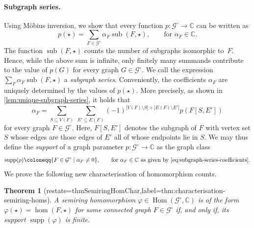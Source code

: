 \documentclass[11pt]{scrartcl}
\theoremstyle{definition}
\theoremstyle{plain}
\newtheorem{theorem}[definition]{Theorem}
\theoremstyle{remark}
\renewcommand\phi\varphi
\DeclareMathOperator\Hom{Hom}
\DeclareMathOperator{\supp}{supp}
\DeclareMathOperator{\sub}{sub}
\newcommand{\lG}{\mathcal{G}^\circ}
\newcommand{\C}{\mathbb{C}}
\begin{document}
	\paragraph{Subgraph series.}
	Using M\"obius inversion, we show that every function $p \colon \lG \to \mathbb{C}$ can be written as
	\[
		p(\star) = \sum_{F \in \lG} \alpha_F \sub(F, \star),
        \qquad 
        \text{for } \alpha_F \in \mathbb{C}.
	\]
	The function $\sub(F, \star)$ counts the number of subgraphs isomorphic to~$F$.
	Hence, while the above sum is infinite, only finitely many summands contribute to the value of $p(G)$ for every graph $G \in \lG$.
	We call the expression $\sum_{F} \alpha_F \sub(F, \star)$ a \emph{subgraph series}.
	Conveniently, the coefficients $\alpha_F$ are uniquely determined by the values of $p(\star)$.
	More precisely, as shown in \cref{lem:unique-subgraph-series}, it holds that
	\begin{equation}\label{eq:subgraph-series-coefficients}
		\alpha_F = \sum_{S \subseteq V(F)} \ \sum_{E' \subseteq E(F)} (-1)^{|V(F) \setminus S| + |E(F) \setminus E'|} p(F[S, E'])
	\end{equation}
	for every graph $F\in \lG$.
	Here, $F[S, E']$ denotes the subgraph of $F$ with vertex set $S$ whose edges are those edges of $E'$ all of whose endpoints lie in $S$.
	We may thus define the \emph{support} of a graph parameter $p \colon \lG \to \mathbb{C}$ as the graph class
	\[
		\supp(p) \coloneqq \{F \in \lG \mid \alpha_F \neq 0\},
        \qquad
        \text{for } \alpha_F \in \C \text{ as given by \cref{eq:subgraph-series-coefficients}.}
	\]
	We prove the following new characterisation of homomorphism counts.


	\begin{theorem}[restate=thmSemiringHomChar,label=thm:characterisation-semiring-homs]
		A semiring homomorphism $\phi \in \Hom(\lG, \mathbb{C})$ is of the form $\phi(\star) = \hom(F, \star)$ for some connected graph $F \in \lG$
		if, and only if, its support $\supp(\phi)$ is finite.
	\end{theorem}
\end{document}
